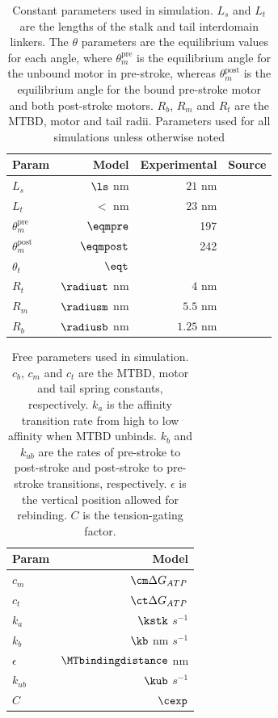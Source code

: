 \documentclass[9pt,twocolumn,twoside]{article}
\begin{document}
\begin{table}
  \centering
  \begin{tabular}{lrrr}
    Param & Model & Experimental & Source \\
    \hline
    $L_s$ & $\ls$ nm & $21$ nm & \cite{Burgess2003, 3vkh-cite, carter-paper}\\
    $L_t$ & $\lt$ nm & $23$ nm & \cite{Burgess2003, 3vkh-cite, carter-paper}\\
    $\theta_m^{\mbox{pre}}$ & $\eqmpre$ &  197 & \cite{Burgess2003}\\
    $\theta_m^{\mbox{post}}$ & $\eqmpost$ & 242 & \cite{Burgess2003}\\
    $\theta_t$ & $\eqt$ &  & \\
    $R_t$ & $\radiust$ nm & $4$ nm & \cite{Burgess2003}\\
    $R_m$ & $\radiusm$ nm & $5.5$ nm & \cite{Burgess2003}\\
    $R_b$ & $\radiusb$ nm & $1.25$ nm & \cite{Burgess2003}\\
    \hline
  \end{tabular}
  \caption{Constant parameters used in simulation. $L_s$ and $L_t$ are the lengths of the stalk and tail interdomain linkers. The $\theta$ parameters are the equilibrium values for each angle, where $\theta_m^{\mbox{pre}}$ is the equilibrium angle for the unbound motor in pre-stroke, whereas $\theta_m^{\mbox{post}}$ is the equilibrium angle for the bound pre-stroke motor and both post-stroke motors. $R_b$, $R_m$ and $R_t$ are the MTBD, motor and tail radii. Parameters used for all simulations unless otherwise noted}
  \label{table:constparams}
\end{table}

\begin{table}
  \centering
  \begin{tabular}{lr}
    Param & Model  \\
    \hline
    $c_m$ & $\cm \Delta G_{ATP}$  \\
    $c_t$ & $\ct \Delta G_{ATP}$  \\
    $k_a$ & $\kstk$  $s^{-1}$  \\
    $k_b$ & $\kb$  nm $s^{-1}$  \\
    $\epsilon$ &  $\MTbindingdistance$ nm  \\
    $k_{ub}$ & $\kub$ $s^{-1}$  \\
    $C$ & $\cexp$  \\
    \hline
  \end{tabular}
  \caption{Free parameters used in simulation. $c_b$, $c_m$ and $c_t$ are the MTBD, motor and tail spring constants, respectively. $k_a$ is the affinity transition rate from high to low affinity when MTBD unbinds. $k_b$ and $k_{ub}$ are the rates of pre-stroke to post-stroke and post-stroke to pre-stroke transitions, respectively. $\epsilon$ is the vertical position allowed for rebinding. $C$ is the tension-gating factor.}
  \label{table:params}
\end{table}
\end{document}
